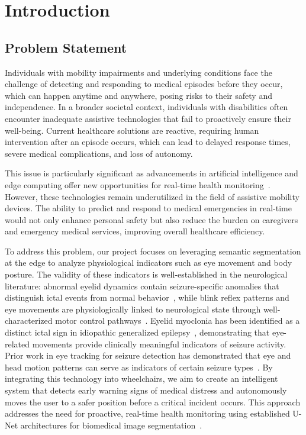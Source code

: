 \chapter{Introduction}\label{chap:introduction}

\section{Problem Statement}\label{sec:problem-statement}

Individuals with mobility impairments and underlying conditions face the challenge of detecting and responding to medical episodes before they occur, which can happen anytime and anywhere, posing risks to their safety and independence. In a broader societal context, individuals with disabilities often encounter inadequate assistive technologies that fail to proactively ensure their well-being. Current healthcare solutions are reactive, requiring human intervention after an episode occurs, which can lead to delayed response times, severe medical complications, and loss of autonomy.

This issue is particularly significant as advancements in artificial intelligence and edge computing offer new opportunities for real-time health monitoring~\cite{lakshminarayanan2023health}. However, these technologies remain underutilized in the field of assistive mobility devices. The ability to predict and respond to medical emergencies in real-time would not only enhance personal safety but also reduce the burden on caregivers and emergency medical services, improving overall healthcare efficiency.

To address this problem, our project focuses on leveraging semantic segmentation at the edge to analyze physiological indicators such as eye movement and body posture. The validity of these indicators is well-established in the neurological literature: abnormal eyelid dynamics contain seizure-specific anomalies that distinguish ictal events from normal behavior~\cite{sedighsarvestani2012eyelid}, while blink reflex patterns and eye movements are physiologically linked to neurological state through well-characterized motor control pathways~\cite{evinger2011blinking}. Eyelid myoclonia has been identified as a distinct ictal sign in idiopathic generalized epilepsy~\cite{stefan2007eyelid}, demonstrating that eye-related movements provide clinically meaningful indicators of seizure activity. Prior work in eye tracking for seizure detection has demonstrated that eye and head motion patterns can serve as indicators of certain seizure types~\cite{provost2022eye}. By integrating this technology into wheelchairs, we aim to create an intelligent system that detects early warning signs of medical distress and autonomously moves the user to a safer position before a critical incident occurs. This approach addresses the need for proactive, real-time health monitoring using established U-Net architectures for biomedical image segmentation~\cite{ronneberger2015}.

